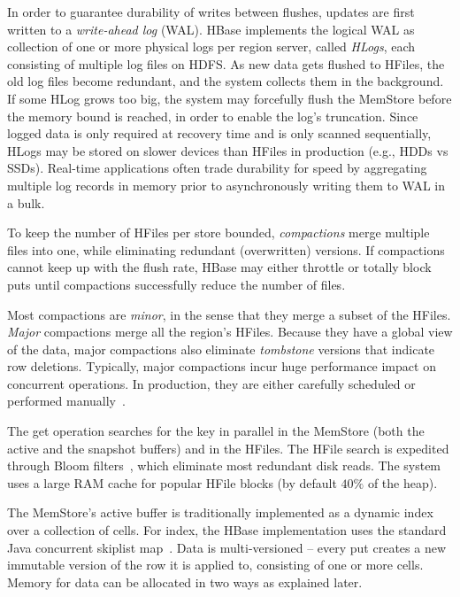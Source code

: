 In order to guarantee durability of writes between flushes, updates are first written to 
a \emph{write-ahead log} (WAL). HBase implements the logical WAL as collection of one or more physical 
logs per region server, called \emph{HLogs}, each consisting of multiple log files on HDFS. 
As new data gets flushed to HFiles, the old log files become redundant, and the system collects 
them in the background. 
If some HLog grows too big, the system may forcefully
flush the MemStore before the memory bound is reached, in order to enable the log's truncation. 
Since logged data is only required at recovery time and is only scanned sequentially, HLogs
may be stored on slower devices than HFiles in production (e.g., HDDs vs SSDs). 
Real-time applications often trade durability for speed by aggregating multiple log records 
in memory prior to asynchronously writing them to WAL in a bulk. 

To keep the number of HFiles per store bounded, \emph{compactions} merge multiple files 
into one, while eliminating redundant (overwritten) versions. If compactions cannot keep up
with the flush rate, HBase may either throttle or totally block  puts until  compactions 
successfully reduce the number of files. 

Most compactions are \emph{minor}, 
in the sense that they merge a subset of the HFiles. \emph{Major} compactions merge all the region's 
HFiles. Because they have a global view of the data, major compactions also eliminate 
{\em tombstone} versions that indicate row deletions. Typically, major compactions incur huge 
performance impact on concurrent operations. In production, they are either carefully scheduled 
or performed manually~\cite{hbasetuning}.

The get operation searches for the key in parallel in the MemStore (both the active and the 
snapshot buffers) and in the HFiles. The HFile search  is expedited through Bloom 
filters~\cite{Chang2008}, which eliminate most redundant disk reads. The system 
uses a large RAM cache for popular HFile blocks (by default $40\%$ of the heap).

The MemStore's active buffer is traditionally implemented as a dynamic index over a collection of cells.  
For index, the HBase implementation uses the standard Java concurrent skiplist map~\cite{javaskiplist}.
Data is multi-versioned -- every put creates a new immutable version of the row it is applied to, 
consisting of one or more cells. Memory for data can be allocated in two ways as explained later.

